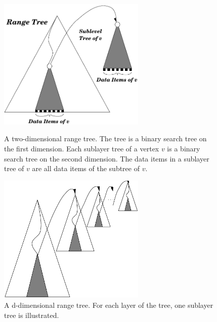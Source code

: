 \begin{ccTexOnly}
    \begin{figure}[htbp]
    \begin{minipage}{7cm}
    \begin{center}
    \includegraphics[width=7cm,clip]{SearchStructures/range2}
    \end{center}
    \caption{\label{User:fig:range.eps}A two-dimensional range tree. The
      tree is a binary search tree on the first dimension. Each
      sublayer tree of a vertex $v$ is a binary search tree on the second
      dimension. The data items in a sublayer tree of $v$ are
      all data items of the subtree of $v$.}
    \end{minipage}
    \hspace*{1em}
    \begin{minipage}{7cm}
    \begin{center}
    \includegraphics[width=7cm,clip]{SearchStructures/d-range}
    \end{center}
    \caption{\label{User:fig:d-range.eps}A d-dimensional range tree. For
      each layer of the tree, one
      sublayer tree is illustrated.}
    \vspace{2\baselineskip}
    \end{minipage}
    \end{figure}
\end{ccTexOnly}

